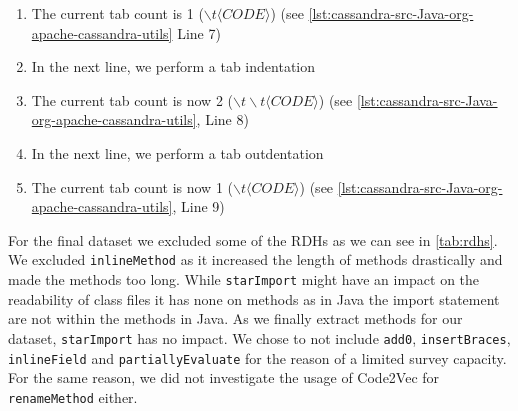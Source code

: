 \documentclass[%
class=scrreprt,
chapterprefix=false,%
open=right,%
twoside=false,%
paper=a4,%
logofile={Logo\_zentral\_farbig\_EN.png},%
thesistype=master,%
UKenglish,%
]{se2thesis}
\theoremstyle{definition}
\begin{document}
	\begin{enumerate}
		\item The current tab count is 1 ($\backslash t \langle CODE \rangle$) (see \autoref{lst:cassandra-src-Java-org-apache-cassandra-utils} Line 7)
		\item In the next line, we perform a tab indentation
		\item The current tab count is now 2 ($\backslash t \backslash t \langle CODE \rangle $) (see \autoref{lst:cassandra-src-Java-org-apache-cassandra-utils}, Line 8)
		\item In the next line, we perform a tab outdentation
		\item The current tab count is now 1 ($\backslash t \langle CODE \rangle $) (see \autoref{lst:cassandra-src-Java-org-apache-cassandra-utils}, Line 9)
	\end{enumerate}
	

	For the final dataset we excluded some of the RDHs as we can see in \autoref{tab:rdhs}.
	We excluded \texttt{inlineMethod} as it increased the length of methods drastically and made the methods too long.
	While \texttt{starImport} might have an impact on the readability of class files it has none on methods as in Java the import statement are not within the methods in Java. As we finally extract methods for our dataset, \texttt{starImport} has no impact.
	We chose to not include \texttt{add0}, \texttt{insertBraces}, \texttt{inlineField} and \texttt{partiallyEvaluate} for the reason of a limited survey capacity.
	For the same reason, we did not investigate the usage of Code2Vec for \texttt{renameMethod} either.

	
\end{document}
